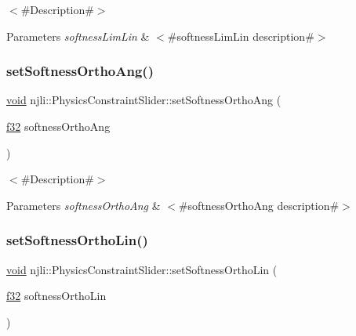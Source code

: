 $<$\#\+Description\#$>$


\begin{DoxyParams}{Parameters}
{\em softness\+Lim\+Lin} & $<$\#softness\+Lim\+Lin description\#$>$ \\
\hline
\end{DoxyParams}
\mbox{\label{classnjli_1_1_physics_constraint_slider_a3eccd87e8fb25f41b0668cf4275f484c}} 
\subsubsection{\texorpdfstring{set\+Softness\+Ortho\+Ang()}{setSoftnessOrthoAng()}}
{\footnotesize\ttfamily \mbox{\hyperlink{_thread_8h_af1e856da2e658414cb2456cb6f7ebc66}{void}} njli\+::\+Physics\+Constraint\+Slider\+::set\+Softness\+Ortho\+Ang (\begin{DoxyParamCaption}\item[{\mbox{\hyperlink{_util_8h_a5f6906312a689f27d70e9d086649d3fd}{f32}}}]{softness\+Ortho\+Ang }\end{DoxyParamCaption})}

$<$\#\+Description\#$>$


\begin{DoxyParams}{Parameters}
{\em softness\+Ortho\+Ang} & $<$\#softness\+Ortho\+Ang description\#$>$ \\
\hline
\end{DoxyParams}
\mbox{\label{classnjli_1_1_physics_constraint_slider_af6d2ad8ed10a4634f2e0c9e15a43cf75}} 
\subsubsection{\texorpdfstring{set\+Softness\+Ortho\+Lin()}{setSoftnessOrthoLin()}}
{\footnotesize\ttfamily \mbox{\hyperlink{_thread_8h_af1e856da2e658414cb2456cb6f7ebc66}{void}} njli\+::\+Physics\+Constraint\+Slider\+::set\+Softness\+Ortho\+Lin (\begin{DoxyParamCaption}\item[{\mbox{\hyperlink{_util_8h_a5f6906312a689f27d70e9d086649d3fd}{f32}}}]{softness\+Ortho\+Lin }\end{DoxyParamCaption})}

